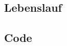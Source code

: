 \documentclass[a4paper,12pt]{article}
\begin{document}
%

%

%

\subsection*{Lebenslauf}


\subsection*{Code}

\end{document}

